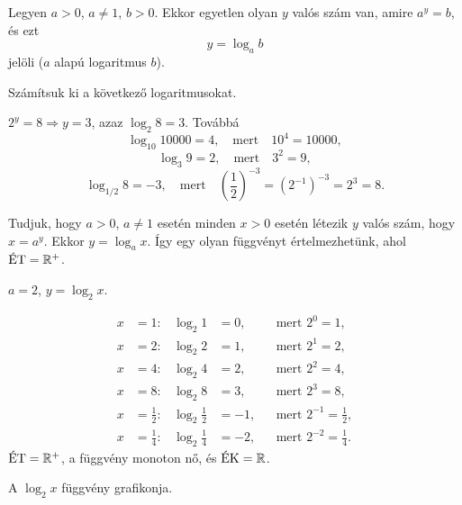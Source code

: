 \documentclass[11pt]{article}
\begin{document}
\begin{defbox}
\begin{definition}[Logaritmus]
Legyen $a>0$, $a\neq 1$, $b>0$. Ekkor egyetlen olyan $y$ valós szám van, amire $a^{y}=b$, és ezt
\[
y=\log_{a} b
\]
jelöli ($a$ alapú logaritmus $b$).
\end{definition}
\end{defbox}

\begin{exbox}
\begin{example}
Számítsuk ki a következő logaritmusokat.
\end{example}
\end{exbox}
\begin{solution}
$2^{y}=8 \Rightarrow y=3$, azaz $\log_{2}8=3$. Továbbá
\[
\log_{10}10000=4,\quad \text{mert}\quad 10^{4}=10000,
\]
\[
\log_{3}9=2,\quad \text{mert}\quad 3^{2}=9,
\]
\[
\log_{1/2}8=-3,\quad \text{mert}\quad
\left(\frac{1}{2}\right)^{-3}=\left(2^{-1}\right)^{-3}=2^{3}=8 .
\]
\end{solution}

Tudjuk, hogy $a>0$, $a\neq 1$ esetén minden $x>0$ esetén létezik $y$ valós szám, hogy $x=a^{y}$. Ekkor $y=\log_{a}x$. Így egy olyan függvényt értelmezhetünk, ahol $\ET=\R^{+}$.

\begin{exbox}
\begin{example}
$a=2$, $y=\log_{2}x$.
\end{example}
\end{exbox}
\begin{solution}
\begin{align*}
x&=1: & \log_{2}1&=0, && \text{mert } 2^{0}=1,\\
x&=2: & \log_{2}2&=1, && \text{mert } 2^{1}=2,\\
x&=4: & \log_{2}4&=2, && \text{mert } 2^{2}=4,\\
x&=8: & \log_{2}8&=3, && \text{mert } 2^{3}=8,\\
x&=\tfrac{1}{2}: & \log_{2}\tfrac{1}{2}&=-1, && \text{mert } 2^{-1}=\tfrac{1}{2},\\
x&=\tfrac{1}{4}: & \log_{2}\tfrac{1}{4}&=-2, && \text{mert } 2^{-2}=\tfrac{1}{4}.
\end{align*}
$\ET=\R^{+}$, a függvény monoton nő, és $\EK=\R$.

\begin{notefig}{A $\log_{2}x$ függvény grafikonja.}
\end{notefig}
\end{solution}
\end{document}
